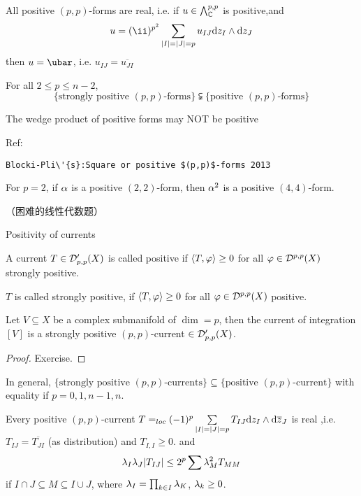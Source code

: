 \begin{cor}
All positive $(p,p)$-forms are real, i.e.
if $u\in\bigwedge\nolimits^{p,p}_{\mathbb{C}}$ is positive,and
$$u=(\ii)^{p^2}
\sum_{|I|=|J|=p}
u_{IJ}
\td z_I\wedge\td z_{J}
$$
then $u=\ubar$, i.e. $u_{IJ}=\overline{u_{JI}}$
\end{cor}

\begin{rem}
For all $2\leq p\leq n-2$,
$$\{\text{strongly positive $(p,p)$-forms}\}
\subsetneqq
\{\text{positive $(p,p)$-forms}\}$$

The wedge product of positive forms may NOT be positive
\end{rem}

\begin{rem}Ref:

\verb"Blocki-Pli\'{s}:Square or positive $(p,p)$-forms 2013"

For $p=2$, if $\alpha$ is a positive $(2,2)$-form,
then $\alpha^2$ is a positive $(4,4)$-form.
\end{rem}
（困难的线性代数题）

Positivity of currents

\begin{definition}
A current $T\in\mathcal{D}'_{p,p}(X)$ is called positive
if $\langle T,\varphi \rangle\geq 0$ for all $\varphi\in\mathcal{D}^{p,p}(X)$
strongly positive.

$T$ is called strongly positive, if
$\langle T,\varphi \rangle\geq 0$ for all $\varphi\in\mathcal{D}^{p,p}(X)$ positive.
\end{definition}

\begin{example}
Let $V\subseteq X$ be a complex submanifold of $\dim=p$,
then the current of integration $[V]$ is a
strongly positive $(p,p)$-current $\in\mathcal{D}'_{p,p}(X)$.
\end{example}

\begin{proof}
Exercise.
\end{proof}

\begin{rem}
In general, $\{\text{strongly positive $(p,p)$-currents}\}
\subseteq\{\text{positive $(p,p)$-current}\}$
with equality if $p=0,1,n-1,n$.
\end{rem}

\begin{rem}
Every positive $(p,p)$-current
$T=_{loc}(-1)^p\sum\limits_{|I|=|J|=p}T_{IJ}\mathrm{d} z_I\wedge\mathrm{d}\overline{z}_J$
is real ,i.e. $T_{IJ}=\overline{T_{JI}}$ (as distribution) and
$T_{I,I}\geq 0$. and
$$
  \lambda_I\lambda_J|T_{IJ}|\leq 2^p\sum\lambda_M^2T_{MM}
$$
if $I\cap J\subseteq M\subseteq I\cup J$,
where $\lambda_I=\prod_{k\in I}\lambda_K$, $\lambda_k\geq 0$.
\end{rem}

